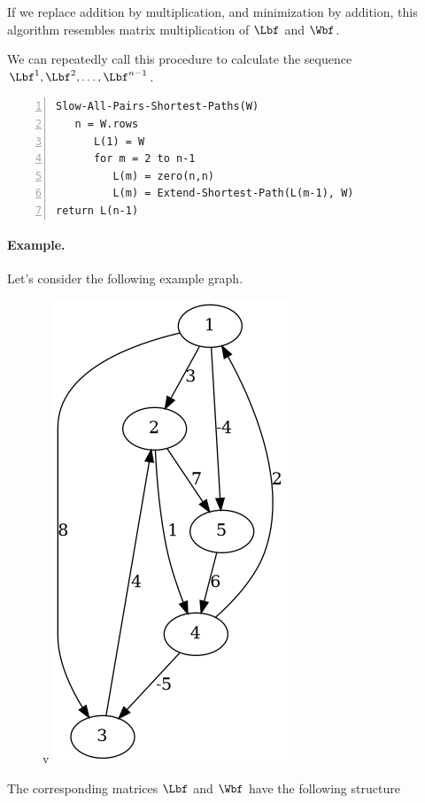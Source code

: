If we replace addition by multiplication, and minimization by addition, this algorithm resembles matrix multiplication of $\Lbf$ and $\Wbf$.

We can repeatedly call this procedure to calculate the sequence $\Lbf^1, \Lbf^2,\ldots, \Lbf^{n-1}$.

\begin{Verbatim}[numbers=left, xleftmargin=5mm]
Slow-All-Pairs-Shortest-Paths(W)
   n = W.rows
      L(1) = W
      for m = 2 to n-1
         L(m) = zero(n,n)
         L(m) = Extend-Shortest-Path(L(m-1), W)
return L(n-1)
\end{Verbatim}

\paragraph{Example.} Let's consider the following example graph.

\begin{figure}[H]v
\centering
\includegraphics[scale=0.5]{images/apsp_01.png}
\end{figure}

The corresponding matrices $\Lbf$ and $\Wbf$ have the following structure

